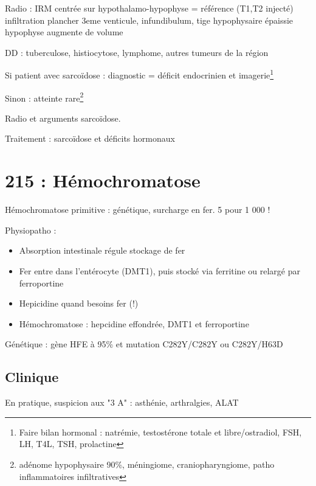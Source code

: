 \documentclass[11pt]{article}
\begin{document}
Radio : IRM centrée sur hypothalamo-hypophyse = référence (T1,T2 injecté) \thus
infiltration plancher 3eme venticule, infundibulum, tige hypophysaire épaissie
\textpm{} hypophyse augmente de volume

DD : tuberculose, histiocytose, lymphome, autres tumeurs de la région 

Si patient avec sarcoïdose : diagnostic = déficit endocrinien et imagerie\footnote{Faire bilan hormonal : natrémie, testostérone totale et libre/ostradiol,
FSH, LH, T4L, TSH, prolactine}

Sinon : atteinte rare\footnote{adénome hypophysaire 90\%, méningiome, craniopharyngiome, patho
inflammatoires infiltratives}

Radio et arguments sarcoïdose.

Traitement : sarcoïdose et déficits hormonaux

\section{215 : Hémochromatose}
\label{sec:org488d2de}
Hémochromatose primitive : génétique, surcharge en fer. 5 pour 1 000 !

Physiopatho : 
\begin{itemize}
\item Absorption intestinale régule stockage de fer
\item Fer entre dans l'entérocyte (DMT1), puis stocké via ferritine ou relargé par ferroportine
\item Hepicidine \dec quand besoins fer \inc (!)
\item Hémochromatose : hepcidine effondrée, DMT1 et ferroportine \inc
\end{itemize}

Génétique : gène HFE à 95\% et mutation C282Y/C282Y ou C282Y/H63D

\subsection{Clinique}
\label{sec:org2e645ee}
En pratique, suspicion aux "3 A" : asthénie, arthralgies, \inc ALAT
\end{document}
